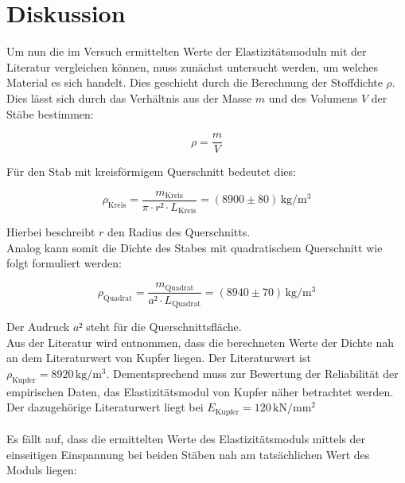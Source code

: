 %

%
\section{Diskussion}
\label{sec:Diskussion}

Um nun die im Versuch ermittelten Werte der Elastizitätsmoduln mit der Literatur vergleichen können, muss
zunächst untersucht werden, um welches Material es sich handelt. Dies geschieht durch die Berechnung der Stoffdichte $\rho$.
Dies lässt sich durch das Verhältnis aus der Masse $m$ und des Volumens $V$ der Stäbe bestimmen:

\begin{equation*}
    \rho = \frac{m}{V}
\end{equation*}

\noindent Für den Stab mit kreisförmigem Querschnitt bedeutet dies:

\begin{equation}
    \rho_\text{Kreis} = \frac{m_\text{Kreis}}{\pi\cdot r²\cdot L_\text{Kreis}} = (8900 \pm 80)\,\unit{\kilo\gram\per\cubic\meter}
\end{equation}

\noindent Hierbei beschreibt $r$ den Radius des Querschnitts.\\
Analog kann somit die Dichte des Stabes mit quadratischem Querschnitt wie folgt formuliert werden:

\begin{equation}
    \rho_\text{Quadrat} = \frac{m_\text{Quadrat}}{a²\cdot L_\text{Quadrat}} = (8940 \pm 70)\,\unit{\kilo\gram\per\cubic\meter}
\end{equation}

\noindent Der Audruck $a²$ steht für die Querschnittsfläche.\\
Aus der Literatur \cite{Dichte_Kupfer} wird entnommen, dass die berechneten Werte der Dichte nah an dem Literaturwert von Kupfer liegen.
Der Literaturwert ist $\rho_\text{Kupfer} = 8920\,\unit{\kilo\gram\per\cubic\meter}$. Dementsprechend muss zur Bewertung der Reliabilität der
empirischen Daten, das Elastizitätsmodul von Kupfer näher betrachtet werden. Der dazugehörige Literaturwert \cite{Modul_Kupfer} liegt bei
$E_\text{Kupfer} = 120\,\unit{\kilo\newton\per\milli\meter\squared}$\\\\

\noindent Es fällt auf, dass die ermittelten Werte des Elastizitätsmoduls mittels der einseitigen Einspannung bei beiden Stäben nah am 
tatsächlichen Wert des Moduls liegen:

